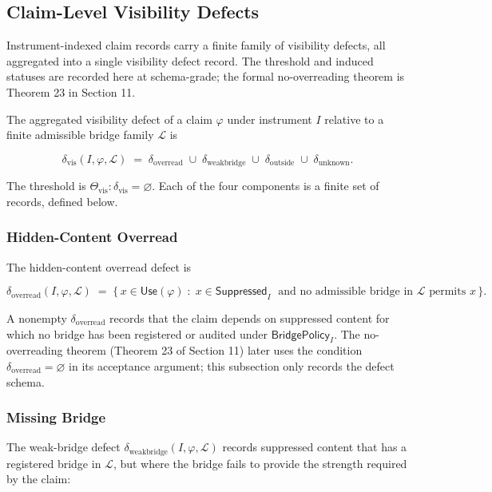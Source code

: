 \documentclass[11pt]{article}
\theoremstyle{definition}
\begin{document}
\subsection{Claim-Level Visibility Defects}

Instrument-indexed claim records carry a finite family of visibility defects, all aggregated into a single visibility defect record. The threshold and induced statuses are recorded here at schema-grade; the formal no-overreading theorem is Theorem 23 in Section 11.

The aggregated visibility defect of a claim \(\varphi\) under instrument \(I\) relative to a finite admissible bridge family \(\mathcal L\) is

\[
\delta_{\mathrm{vis}}(I,\varphi,\mathcal L)\;=\;\delta_{\mathrm{overread}}\;\cup\;\delta_{\mathrm{weakbridge}}\;\cup\;\delta_{\mathrm{outside}}\;\cup\;\delta_{\mathrm{unknown}}.
\]

The threshold is \(\Theta_{\mathrm{vis}}:\delta_{\mathrm{vis}}=\varnothing\). Each of the four components is a finite set of records, defined below.

\subsubsection{Hidden-Content Overread}

The hidden-content overread defect is

\[
\delta_{\mathrm{overread}}(I,\varphi,\mathcal L)\;=\;\{\,x\in\mathsf{Use}(\varphi)\;:\;x\in\mathsf{Suppressed}_I\;\text{ and no admissible bridge in }\mathcal L\text{ permits }x\,\}.
\]

A nonempty \(\delta_{\mathrm{overread}}\) records that the claim depends on suppressed content for which no bridge has been registered or audited under \(\mathsf{BridgePolicy}_I\). The no-overreading theorem (Theorem 23 of Section 11) later uses the condition \(\delta_{\mathrm{overread}}=\varnothing\) in its acceptance argument; this subsection only records the defect schema.

\subsubsection{Missing Bridge}

The weak-bridge defect \(\delta_{\mathrm{weakbridge}}(I,\varphi,\mathcal L)\) records suppressed content that has a registered bridge in \(\mathcal L\), but where the bridge fails to provide the strength required by the claim:
\end{document}
